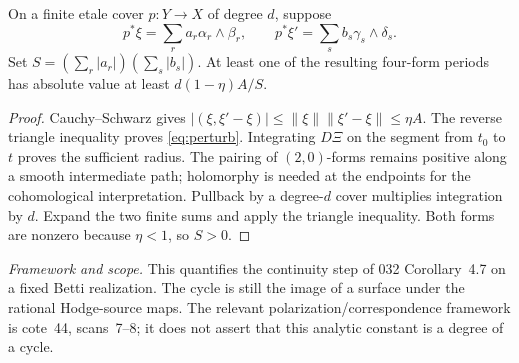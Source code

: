 \documentclass[11pt]{article}
\newcommand{\framework}[1]{\par\smallskip\noindent\textit{Framework and scope.} #1\par}
\theoremstyle{definition}\newtheorem{definition}[theorem]{Definition}\newtheorem{remark}[theorem]{Remark}
\begin{document}
On a finite etale cover $p:Y\to X$ of degree $d$, suppose
\[
 p^*\xi=\sum_r a_r\alpha_r\wedge\beta_r,
 \qquad p^*\xi'=\sum_s b_s\gamma_s\wedge\delta_s.
\]
Set $S=(\sum_r|a_r|)(\sum_s|b_s|)$. At least one of the resulting four-form periods has absolute value at least
$d(1-\eta)A/S$.
\begin{proof}
Cauchy--Schwarz gives
$|(\xi,\xi'-\xi)|\leq\|\xi\|\|\xi'-\xi\|\leq\eta A$.
The reverse triangle inequality proves \eqref{eq:perturb}. Integrating $D\Xi$ on the segment from $t_0$ to $t$ proves the sufficient radius. The pairing of $(2,0)$-forms remains positive along a smooth intermediate path; holomorphy is needed at the endpoints for the cohomological interpretation. Pullback by a degree-$d$ cover multiplies integration by $d$. Expand the two finite sums and apply the triangle inequality. Both forms are nonzero because $\eta<1$, so $S>0$.
\end{proof}
\framework{This quantifies the continuity step of 032 Corollary~4.7 on a fixed Betti realization. The cycle is still the image of a surface under the rational Hodge-source maps. The relevant polarization/correspondence framework is cote~44, scans~7--8; it does not assert that this analytic constant is a degree of a cycle.}
\end{document}
